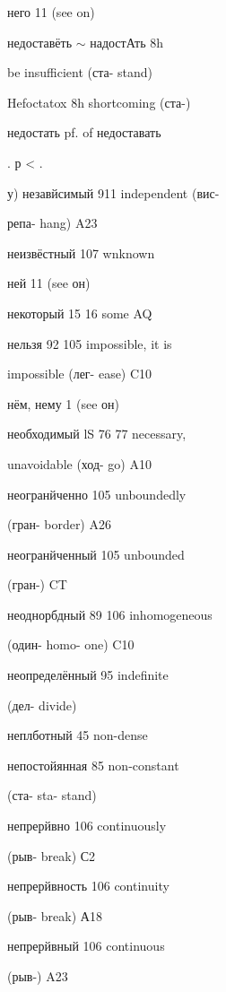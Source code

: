 \begin{minipage}[t]{0.475\textwidth}
\raggedright
\noindent него 11 (see on)\par
\noindent недоставёть $\sim$ надостАть 8h\par
\noindent be insufficient (ста- stand)\par
\noindent Hefoctatox 8h shortcoming (ста-)\par
\noindent недостать pf. of недоставать\par
{}. р < .\par
\noindent у) незавйсимый 911 independent (вис-\par
\noindent репа- hang) A23\par
\noindent неизвёстный 107 wnknown\par
\noindent ней 11 (see он)\par
\noindent некоторый 15 16 some AQ\par
\noindent нельзя 92 105 impossible, it is\par
\noindent impossible (лег- ease) C10\par
\noindent нём, нему 1 (see он)\par
\noindent необходимый lS 76 77 necessary,\par
\noindent unavoidable (ход- go) A10\par
\noindent неогранйченно 105 unboundedly\par
\noindent (гран- border) A26\par
\noindent неогранйченный 105 unbounded\par
\noindent (гран-) CT\par
\noindent неоднорбдный 89 106 inhomogeneous\par
\noindent (один- homo- one) C10\par
\noindent неопределённый 95 indefinite\par
\noindent (дел- divide)\par
\noindent неплботный 45 non-dense\par
\noindent непостойянная 85 non-constant\par
\noindent (ста- sta- stand)\par
\noindent непрерйвно 106 continuously\par
\noindent (рыв- break) С2\par
\noindent непрерйвность 106 continuity\par
\noindent (рыв- break) А18\par
\noindent непрерйвный 106 continuous\par
\noindent (рыв-) A23\par

\end{minipage}
